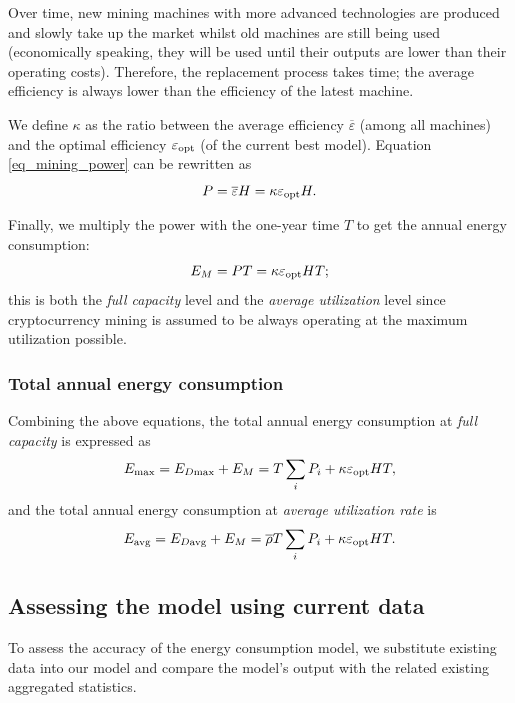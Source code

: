 \documentclass[12pt]{article}
\begin{document}
Over time, new mining machines with more advanced technologies are produced and slowly take up the market whilst old machines are still being used (economically speaking, they will be used until their outputs are lower than their operating costs). Therefore, the replacement process takes time; the average efficiency is always lower than the efficiency of the latest machine.

We define $\kappa$ as the ratio between the average efficiency $\overline{\varepsilon}$ (among all machines) and the optimal efficiency $\varepsilon_{\rm opt}$ (of the current best model). Equation \ref{eq_mining_power} can be rewritten as
\begin{equation}
	P = \overline{\varepsilon} H = \kappa \varepsilon_{\rm opt} H.
\end{equation}

Finally, we multiply the power with the one-year time $T$ to get the annual energy consumption:
\begin{equation}
	E_M = PT = \kappa \varepsilon_{\rm opt} HT;
\end{equation}
this is both the \textit{full capacity} level and the \textit{average utilization} level since cryptocurrency mining is assumed to be always operating at the maximum utilization possible.

\subsubsection{Total annual energy consumption}

Combining the above equations, the total annual energy consumption at \textit{full capacity} is expressed as
\begin{equation}
	E_{\rm max} = E_{D \rm max} + E_M = T \sum_i P_i + \kappa \varepsilon_{\rm opt} HT,
\end{equation}
and the total annual energy consumption at \textit{average utilization rate} is
\begin{equation}
	E_{\rm avg} = E_{D \rm avg} + E_M = \overline{\rho} T \sum_i P_i + \kappa \varepsilon_{\rm opt} HT.
\end{equation}

\subsection{Assessing the model using current data}

To assess the accuracy of the energy consumption model, we substitute existing data into our model and compare the model's output with the related existing aggregated statistics.
\end{document}
